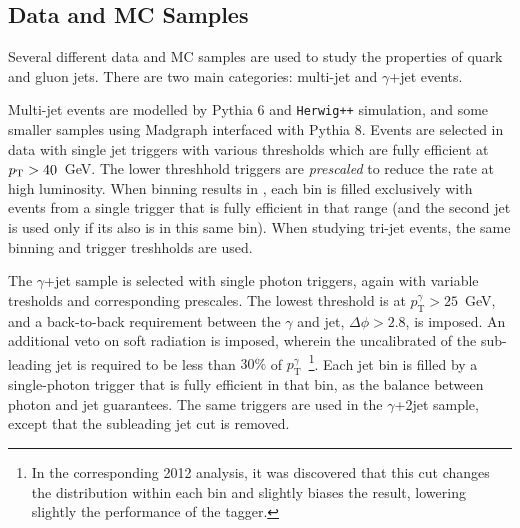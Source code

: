 \subsection{Data and MC Samples}
\label{jet-reconstruction:qg:samples}

Several different data and MC samples are used to study the properties of quark and gluon jets. There are two main categories: multi-jet and $\gamma$+jet events. 

Multi-jet events are modelled by Pythia 6 and \texttt{Herwig++} simulation, and some smaller samples using Madgraph interfaced with Pythia 8. Events are selected in data with single jet triggers with various thresholds which are fully efficient at $p_{\text{T}} > 40$~GeV. The lower \pt threshhold triggers are \textit{prescaled} to reduce the rate at high luminosity. When binning results in \pt, each bin is filled exclusively with events from a single trigger that is fully efficient in that range (and the second jet is used only if its \pt also is in this same bin). When studying tri-jet events, the same \pt binning and trigger treshholds are used.

The $\gamma$+jet sample is selected with single photon triggers, again with variable tresholds and corresponding prescales. The lowest threshold is at $p_\mathrm{T}^\gamma > 25$~GeV, and a back-to-back requirement between the $\gamma$ and jet, $\Delta \phi > 2.8$, is imposed. An additional veto on soft radiation is imposed, wherein the uncalibrated \pt of the sub-leading jet is required to be less than $30\%$ of $p_\mathrm{T}^\gamma$~\cite{JES2010}\footnote{In the corresponding 2012 analysis, it was discovered that this cut changes the \pt distribution within each \pt bin and slightly biases the result, lowering slightly the performance of the tagger.}. Each jet \pt bin is filled by a single-photon trigger that is fully efficient in that bin, as the balance between photon and jet guarantees. The same triggers are used in the $\gamma$+2jet sample, except that the subleading jet \pt cut is removed.



